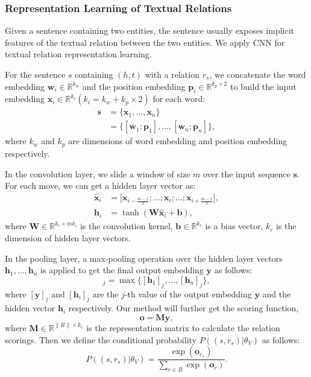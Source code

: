 \documentclass[letterpaper]{article} %
\begin{document}
\subsubsection{Representation Learning of Textual Relations}
\label{sec:relation} 

Given a sentence containing two entities, the sentence usually exposes implicit features of the textual relation between the two entities. We apply CNN for textual relation representation learning.

For the sentence $s$ containing $(h, t)$ with a relation $r_s$, we concatenate the word embedding $\mathbf{w}_i \in \mathbb{R}^{k_w} $ \cite{mikolov2013efficient} and the position embedding $\mathbf{p}_i \in \mathbb{R}^{k_p \times 2} $ \cite{zeng2014relation} to build the input embedding $\mathbf{x}_i \in \mathbb{R}^{k_i} (k_i = k_w + k_p \times 2)$ for each word:
\begin{align}
\mathbf{s} & = \{\mathbf{x}_1,\ldots, \mathbf{x}_n\} \\\nonumber
&=\{[\mathbf{w}_1;\mathbf{p}_1],\ldots, [\mathbf{w}_n;\mathbf{p}_n]\},
\end{align}
where $k_w$ and $k_p$ are dimensions of word embedding and position embedding respectively.

In the convolution layer, we slide a window of size $m$ over the input sequence $\mathbf{s}$. For each move, we can get a hidden layer vector as:
\begin{align}
\mathbf{\hat{x}}_i &= \big[ \mathbf{x}_{i - \frac{m-1}{2}}; \ldots ; \mathbf{x}_i; \ldots ;\mathbf{x}_{i + \frac{m-1}{2}} \big],\\
\mathbf{h}_i &= \tanh(\mathbf{W}\mathbf{\hat{x}}_i + \mathbf{b}),
\end{align}
where $\mathbf{W} \in \mathbb{R}^{k_c \times mk_i}$ is the convolution kernel, $\mathbf{b} \in \mathbb{R}^{k_c}$ is a bias vector, $k_c$ is the dimension of hidden layer vectors.

In the pooling layer, a max-pooling operation over the hidden layer vectors ${\mathbf{h}_1, \ldots , \mathbf{h}_n}$ is applied to get the final output embedding $\mathbf{y}$ as follows:
\begin{equation}
[\mathbf{y}]_{j} = \max \{[\mathbf{h}_{1}]_{j}, \ldots, [\mathbf{h}_{n}]_{j} \},
\end{equation}
where $[\mathbf{y}]_{j}$ and $[\mathbf{h}_{i}]_{j}$ are the $j$-th value of the output embedding $\mathbf{y}$ and  the hidden vector $\mathbf{h}_i$ respectively. Our method will further get the scoring function,
\begin{equation}
\mathbf{o} = \mathbf{M}\mathbf{y},
\label{eq:cnn_distance}
\end{equation}
where $\mathbf{M} \in \mathbb{R}^{\|R\| \times k_c} $ is the representation matrix to calculate the relation scorings. Then we define the conditional probability $P((s, r_s)|{\theta_V})$ as follows:
\begin{equation}
P((s, r_s)|{\theta_V}) = \frac{\exp(\mathbf{o}_{r_s})}{\sum_{r \in R} \exp(\mathbf{o}_{r})}.
\label{eq:cnn_distance1}
\end{equation}
\end{document}
